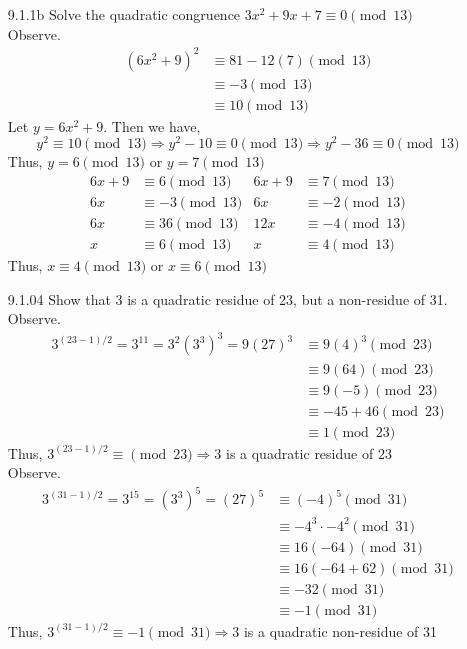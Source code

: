 \documentclass[12pt]{article}
\begin{document}
\begin{enumerate}
	\item[9.1.1b] Solve the quadratic congruence $3x^2+9x+7\equiv0 \pmod{13}  $\\
	Observe.
	\begin{align*}
		(6x^2+9)^2 &\equiv 81-12(7) \pmod{13}\\
				   &\equiv -3 \pmod{13}\\	
				   &\equiv 10 \pmod{13}	
	\end{align*}
	Let $ y=6x^2+9 $. Then we have,
	 \[y^2 \equiv 10 \pmod{13} \Rightarrow y^2-10\equiv 0 \pmod{13}\Rightarrow y^2-36\equiv0\pmod{13}\]
	Thus, $ y=6 \pmod{13}$ or $ y=7 \pmod{13}$
	\begin{align*}
		6x+9 &\equiv 6 \pmod{13} &	6x+9 &\equiv 7 \pmod{13}\\
		6x &\equiv -3 \pmod{13}	&	6x &\equiv -2 \pmod{13}\\
		6x &\equiv 36 \pmod{13}	&	12x &\equiv -4 \pmod{13}\\
		x &\equiv 6 \pmod{13}	&	x &\equiv 4 \pmod{13}
	\end{align*}
	Thus,	$x \equiv 4 \pmod{13}$ or $x \equiv 6 \pmod{13}$
	\item[9.1.04] Show that 3 is a quadratic residue of 23, but a non-residue of 31.\\
	Observe.
	\begin{align*}
		3^{(23-1)/2}=3^{11}=3^2(3^3)^3=9(27)^3 &\equiv 9(4)^3 \pmod{23}\\
											   &\equiv 9(64) \pmod{23}\\
											   &\equiv 9(-5) \pmod{23}\\
											   &\equiv -45 + 46 \pmod{23}\\
											   & \equiv 1 \pmod{23}
	\end{align*}
	Thus, 	$ 	3^{(23-1)/2} \equiv \pmod{23} \Rightarrow 3 $ is a quadratic residue of $ 23 $\\
	Observe.
	\begin{align*}
			3^{(31-1)/2}=3^{15}=(3^3)^5=(27)^5      &\equiv (-4)^5 \pmod{31}\\
													&\equiv -4^3\cdot-4^2 \pmod{31}\\
													&\equiv 16(-64) \pmod{31}\\
													&\equiv 16(-64+62) \pmod{31}\\
													&\equiv -32 \pmod{31}\\
													& \equiv -1 \pmod{31}
	\end{align*}
	Thus, $3^{(31-1)/2}\equiv-1 \pmod{31} \Rightarrow 3 $ is a quadratic non-residue of 31

\end{enumerate}
\end{document}
